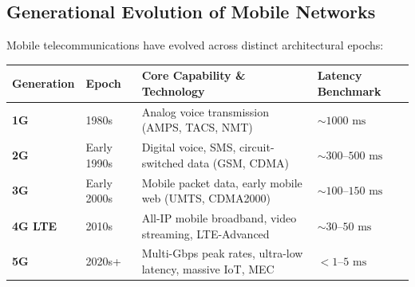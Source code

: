 \subsection{Generational Evolution of Mobile Networks}
Mobile telecommunications have evolved across distinct architectural epochs:
\begin{center}
\begin{tabularx}{\textwidth}{>{\bfseries}l l X l}
\toprule
Generation & Epoch & Core Capability \& Technology & Latency Benchmark\\
\midrule
1G & 1980s & Analog voice transmission (AMPS, TACS, NMT) & $\sim 1000\text{ ms}$\\
2G & Early 1990s & Digital voice, SMS, circuit-switched data (GSM, CDMA) & $\sim 300\text{--}500\text{ ms}$\\
3G & Early 2000s & Mobile packet data, early mobile web (UMTS, CDMA2000) & $\sim 100\text{--}150\text{ ms}$\\
4G LTE & 2010s & All-IP mobile broadband, video streaming, LTE-Advanced & $\sim 30\text{--}50\text{ ms}$\\
5G & 2020s+ & Multi-Gbps peak rates, ultra-low latency, massive IoT, MEC & $< 1\text{--}5\text{ ms}$\\
\bottomrule
\end{tabularx}
\end{center}

